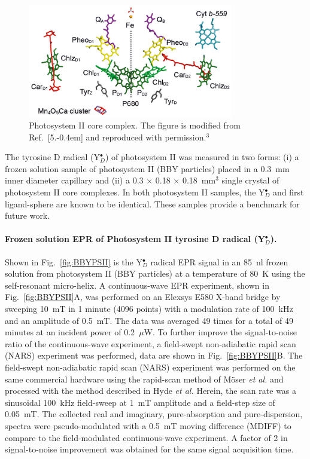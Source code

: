 \begin{figure}[htb]
\centering
\includegraphics[width=0.8\textwidth]{Kapitel/Ch5-Images/PSII_CORE.eps}
\caption[Photosystem II core complex.]{Photosystem II core complex. The figure is modified from Ref.~[5.\kern-0.4em] and reproduced with permission.$^3$}
\label{fig:psiicore}
\end{figure}

The tyrosine D radical (Y$_D^\bullet$) of photosystem II was measured in two forms: (i) a frozen solution sample of photosystem II (BBY particles) \cite{BBY1981} placed in a 0.3~mm inner diameter capillary and (ii) a 0.3 $\times$ 0.18 $\times$ 0.18~mm$^3$ single crystal of photosystem II core complexes. \cite{KERN2005147} In both photosystem II samples, the Y$_D^\bullet$ and first ligand-sphere are known to be identical. These samples provide a benchmark for future work.

\paragraph{Frozen solution EPR of Photosystem II tyrosine D radical (Y$_D^\bullet$).}
Shown in Fig.~\ref{fig:BBYPSII} is the Y$_D^\bullet$ radical EPR signal in an 85~nl frozen solution from photosystem II (BBY particles) at a temperature of 80~K using the self-resonant micro-helix. A continuous-wave EPR experiment, shown in Fig.~\ref{fig:BBYPSII}A, was performed on an Elexsys E580 X-band bridge by sweeping 10~mT in 1 minute (4096 points) with a modulation rate of 100~kHz and an amplitude of 0.5~mT. The data was averaged 49 times for a total of 49 minutes at an incident power of 0.2~$\mu$W. To further improve the signal-to-noise ratio of the continuous-wave experiment, a field-swept non-adiabatic rapid scan (NARS) experiment was performed, data are shown in Fig.~\ref{fig:BBYPSII}B. The field-swept non-adiabatic rapid scan (NARS) experiment was performed on the same commercial hardware using the rapid-scan method of M\"{o}ser {\em et al.}\cite{MOSER2017} and processed with the method described in Hyde {\em et al.}\cite{Hyde2013MDIFF} Herein, the scan rate was a sinusoidal 100~kHz field-sweep at 1~mT amplitude and a field-step size of 0.05~mT. The collected real and imaginary, pure-absorption and pure-dispersion, spectra were pseudo-modulated with a 0.5~mT moving difference (MDIFF)\cite{Hyde2013MDIFF} to compare to the field-modulated continuous-wave experiment. A factor of 2 in signal-to-noise improvement was obtained for the same signal acquisition time. 

